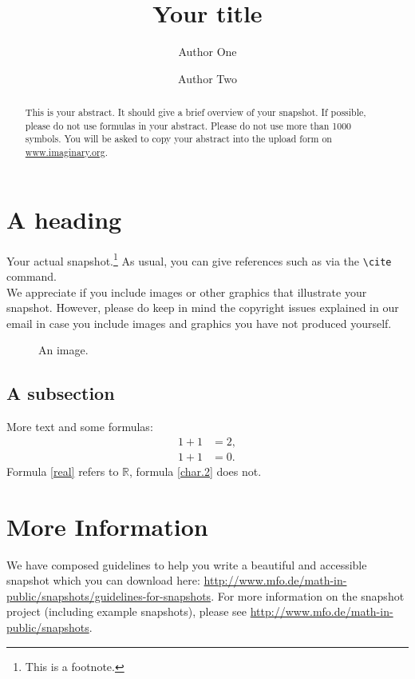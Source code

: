 \documentclass{snapshotmfo}
\author{Author One \and Author Two}
\title{Your title}
\begin{document}
\begin{abstract}
This is your abstract. It should give a brief overview of your snapshot. If possible, please do not use formulas in your abstract. Please do not use more than 1000 symbols. You will be asked to copy your abstract into the upload form on \url{www.imaginary.org}. 
\end{abstract}

\section{A heading}
Your actual snapshot.\footnote{This is a footnote.} As usual, you can give references such as \cite{snapshot,knuth1986texbook} via the \verb+\cite+ command.\\

We appreciate if you include images or other graphics that illustrate your snapshot. However, please do keep in mind the copyright issues explained in our email in case you include images and graphics you have not produced yourself.

\begin{figure}[h]
        \centering \setlength{\fboxsep}{1cm}
        \caption{An image.}
\label{fig:moon}
\end{figure}

\subsection{A subsection}
More text and some formulas:
\begin{align}\label{real}
1+1&=2,\\\label{char.2}
1+1&=0.
\end{align}
Formula \eqref{real} refers to $\mathbb{R}$, formula \eqref{char.2} does not.

\section{More Information}
We have composed guidelines to help you write a beautiful and accessible snapshot which you can download here: \url{http://www.mfo.de/math-in-public/snapshots/guidelines-for-snapshots}. For more information on the snapshot project (including example snapshots), please see \url{http://www.mfo.de/math-in-public/snapshots}.



%
\end{document}
